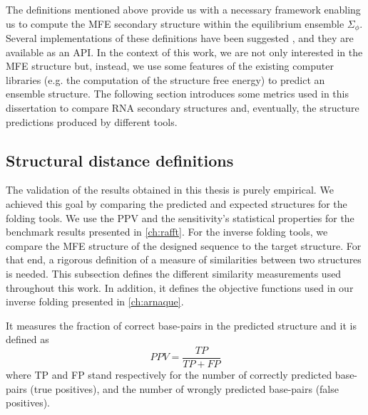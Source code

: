 The definitions mentioned above provide us with a necessary framework enabling us to compute the \ac{MFE} secondary structure within the equilibrium ensemble $\Sigma_{\phi}$. Several implementations of these definitions have been suggested \cite{lorenz11_vienn_packag, reuter2010rnastructure, zadeh2011nupack}, and they are available as an \ac{API}. In the context of this work, we are not only interested in the \ac{MFE} structure but, instead, we use some features of the existing computer libraries (e.g. the computation of the structure free energy) to predict an ensemble structure. The following section introduces some metrics used in this dissertation to compare \ac{RNA} secondary structures and, eventually,  the structure predictions produced by different tools. 
\subsection{Structural distance definitions }
\label{subsec:distance_definitions}
The validation of the results obtained in this thesis is purely empirical. We achieved this goal by comparing the predicted and expected structures for the folding tools. We use the \ac{PPV} and the sensitivity's statistical properties for the benchmark results presented in  \autoref{ch:rafft}. For the inverse folding tools, we compare the \ac{MFE} structure of the designed sequence to the target structure. For that end, a rigorous definition of a measure of similarities between two structures is needed. This subsection defines the different similarity measurements used throughout this work. In addition, it defines the objective functions used in our inverse folding presented in  \autoref{ch:arnaque}. 

\begin{mydef}
	\label{def:ppv}
	It measures the fraction of correct base-pairs in the predicted structure and it is defined as
	\begin{equation}
	PPV = \frac{TP}{TP + FP}
	\end{equation}
where TP and FP stand respectively for the number of correctly predicted base-pairs (true positives), and the number of wrongly predicted base-pairs (false positives). 
	
\end{mydef}

